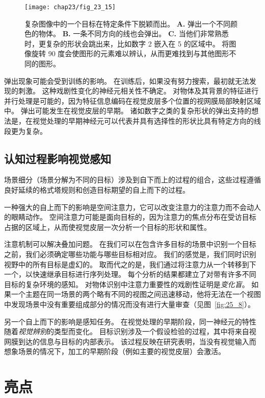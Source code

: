 \begin{figure}[htbp]
	\centering
	\texttt{[image: chap23/fig\_23\_15]}
	\caption{复杂图像中的一个目标在特定条件下脱颖而出。
		\textbf{A.} 弹出一个不同颜色的物体。
		\textbf{B.} 一条不同方向的线也会弹出。
		\textbf{C.} 当他们非常熟悉时，更复杂的形状会跳出来，比如数字 2 嵌入在 5 的区域中。
		将图像旋转 90 度会使图形的元素难以辨认，从而更难找到与其他图形不同的图形\cite{wang1994familiarity}。}
	\label{fig:23_15}
\end{figure}


弹出现象可能会受到训练的影响。
在训练后，如果没有努力搜索，最初就无法发现的刺激。 
这种戏剧性变化的神经元相关性不确定。
对物体及其背景的特征进行并行处理是可能的，因为特征信息编码在视觉皮层多个位置的视网膜局部映射区域中。
弹出可能发生在视觉皮层的早期。
诸如数字之类的复杂形状的弹出支持的想法是，在视觉处理的早期神经元可以代表并具有选择性的形状比具有特定方向的线段更为复杂。



\subsection{认知过程影响视觉感知}

场景细分（场景分解为不同的目标）涉及到自下而上的过程的组合，这些过程遵循良好延续的格式塔规则和创造目标期望的自上而下的过程。


一种强大的自上而下的影响是空间注意力，它可以改变注意力的注意力而不会动人的眼睛动作。
空间注意力可能是面向目标的，因为注意力的焦点分布在受访目标占据的区域上，从而使视觉皮层一次分析一个目标的形状和属性。


注意机制可以解决叠加问题。
在我们可以在包含许多目标的场景中识别一个目标之前，我们必须确定哪些功能与哪些目标相对应。
我们的感觉是，我们同时识别视野中的所有目标是虚幻的。
取而代之的是，我们通过将注意力从一个转移到下一个，以快速继承目标进行序列处理。
每个分析的结果都建立了对带有许多不同目标的复杂环境的感知。
对物体识别中注意力重要性的戏剧性证明是\textit{变化盲}。
如果一个主题在同一场景的两个略有不同的视图之间迅速移动，他将无法在一个视图中发现场景中没有重要组成部分的情况而没有进行大量审查（见图~\ref{fig:25_8}）。


另一个自上而下的影响是感知任务。
在视觉处理的早期阶段，同一神经元的特性随着\textit{视觉辨别}的类型而变化。
目标识别涉及一个假设检验的过程，其中将来自视网膜到达的信息与目标的内部表示。
该过程反映在研究表明，当没有视觉输入而想象场景的情况下，加工的早期阶段（例如主要的视觉皮层）会激活。



\section{亮点}

